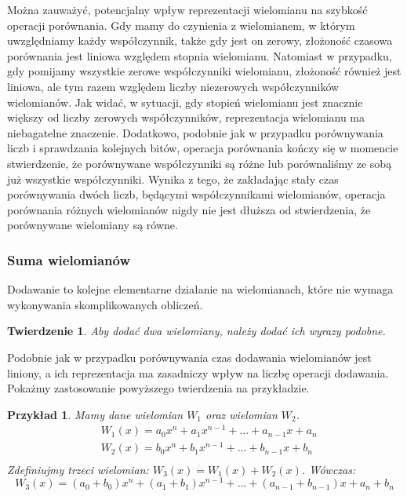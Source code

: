 \documentclass[twoside,a4paper]{book}
\newtheorem{theorem}{Twierdzenie}
\newtheorem{example}{Przykład}
\begin{document}
Można zauważyć, potencjalny wpływ reprezentacji wielomianu na szybkość operacji porównania. Gdy mamy do czynienia z wielomianem, w którym uwzględniamy każdy współczynnik, także gdy jest on zerowy, złożoność czasowa porównania jest liniowa względem stopnia wielomianu. Natomiast w przypadku, gdy pomijamy wszystkie zerowe współczynniki wielomianu, złożoność również jest liniowa, ale tym razem względem liczby niezerowych współczynników wielomianów. Jak widać, w sytuacji, gdy stopień wielomianu jest znacznie większy od liczby zerowych współczynników, reprezentacja wielomianu ma niebagatelne znaczenie. \newline
Dodatkowo, podobnie jak w przypadku porównywania liczb i sprawdzania kolejnych bitów, operacja porównania kończy się w momencie stwierdzenie, że porównywane współczynniki są różne lub porównaliśmy ze sobą już wszystkie współczynniki. Wynika z tego, że zakładając stały czas porównywania dwóch liczb, będącymi współczynnikami wielomianów, operacja porównania różnych wielomianów nigdy nie jest dłuższa od stwierdzenia, że porównywane wielomiany są równe.

\subsubsection{Suma wielomianów}

Dodawanie to kolejne elementarne działanie na wielomianach, które nie wymaga wykonywania skomplikowanych obliczeń.

\begin{theorem}
	Aby dodać dwa wielomiany, należy dodać ich wyrazy podobne.
\end{theorem}

Podobnie jak w przypadku porównywania czas dodawania wielomianów jest liniony, a ich reprezentacja ma zasadniczy wpływ na liczbę operacji dodawania. Pokażmy zastosowanie powyższego twierdzenia na przykładzie.

\begin{example}
	Mamy dane wielomian $W_1$ oraz wielomian $W_2$.
	\begin{equation}
		\begin{split}
			&W_1(x) = a_0x^n + a_1x^{n-1} + ... + a_{n-1}x + a_n \\
			&W_2(x) = b_0x^n + b_1x^{n-1} + ... + b_{n-1}x + b_n \\
		\end{split}
	\end{equation}
	Zdefiniujmy trzeci wielomian: $W_3(x) = W_1(x) + W_2(x)$. Wówczas:
	\begin{equation}
		W_3(x) = (a_0+b_0)x^n + (a_1+b_1)x^{n-1} + ... + (a_{n-1} + b_{n-1})x + a_n + b_n
	\end{equation}
\end{example}
\end{document}
